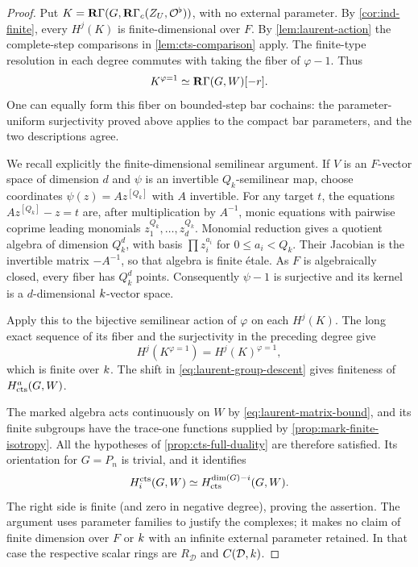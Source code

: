 \begin{proof}
Put $K=\mathbf R\Gamma(G,\mathbf R\Gamma_c(Z_U,\mathcal O^\flat))$, with no external
parameter.  By \cref{cor:ind-finite}, every $H^j(K)$ is
finite-dimensional over $F$.  By \cref{lem:laurent-action} the
complete-step comparisons in \cref{lem:cts-comparison} apply.
The finite-type resolution in each degree commutes with taking
the fiber of $\varphi-1$.  Thus
\begin{equation}\label{eq:laurent-group-descent}
 K^{\varphi=1}\simeq\mathbf R\Gamma(G,W)[-r].
\end{equation}
One can equally form this fiber on bounded-step bar cochains:
the parameter-uniform surjectivity proved above applies to the
compact bar parameters, and the two descriptions agree.

We recall explicitly the finite-dimensional semilinear argument.
If $V$ is an $F$-vector space of dimension $d$ and $\psi$ is an
invertible $Q_k$-semilinear map, choose coordinates
$\psi(z)=Az^{[Q_k]}$ with $A$ invertible.  For any target $t$,
the equations $Az^{[Q_k]}-z=t$ are, after multiplication by
$A^{-1}$, monic equations with pairwise coprime leading
monomials $z_1^{Q_k},\ldots,z_d^{Q_k}$.  Monomial reduction gives
a quotient algebra of dimension $Q_k^d$, with basis
$\prod z_i^{a_i}$ for $0\leq a_i<Q_k$.  Their Jacobian is the
invertible matrix $-A^{-1}$, so that algebra is finite \'{e}tale.
As $F$ is algebraically closed, every fiber has $Q_k^d$ points.
Consequently $\psi-1$ is surjective and its kernel is a
$d$-dimensional $k$-vector space.

Apply this to the bijective semilinear action of $\varphi$ on
each $H^j(K)$.  The long exact sequence of its fiber and the
surjectivity in the preceding degree give
\[
 H^j(K^{\varphi=1})=
       H^j(K)^{\varphi=1},
\]
which is finite over $k$.  The shift in
\cref{eq:laurent-group-descent} gives finiteness of
$H^a_{\mathrm{cts}}(G,W)$.

The marked algebra acts continuously on $W$ by
\cref{eq:laurent-matrix-bound}, and its finite subgroups have
the trace-one functions supplied by
\cref{prop:mark-finite-isotropy}.  All the hypotheses of
\cref{prop:cts-full-duality} are therefore satisfied.  Its
orientation for $G=P_n$ is trivial, and it identifies
\[
 H_i^{\mathrm{cts}}(G,W)\simeq
 H^{\dim(G)-i}_{\mathrm{cts}}(G,W).
\]
The right side is finite (and zero in negative degree), proving
the assertion.  The argument uses parameter families to justify
the complexes; it makes no claim of finite dimension over $F$
or $k$ with an infinite external parameter retained.  In that
case the respective scalar rings are $R_{\mathcal D}$ and
$C(\mathcal D,k)$.
\end{proof}
